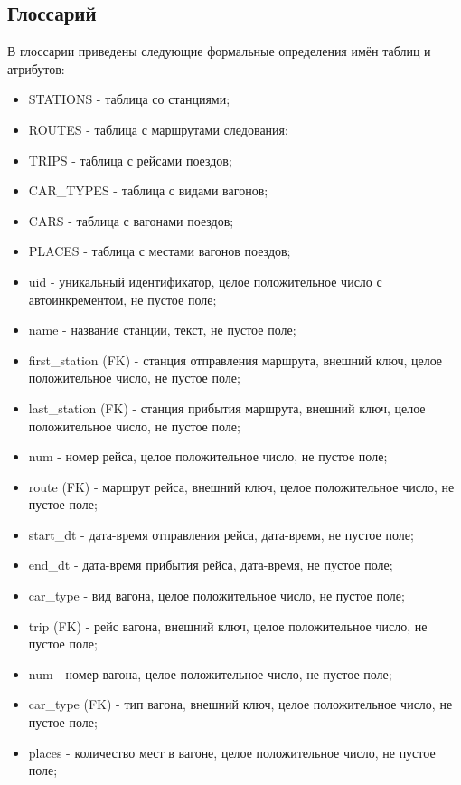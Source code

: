     \subsection{Глоссарий}
        В глоссарии приведены следующие формальные определения имён таблиц и атрибутов:
        \begin{itemize}
            \item STATIONS - таблица со станциями;
            \item ROUTES - таблица с маршрутами следования;
            \item TRIPS - таблица с рейсами поездов;
            \item CAR\_TYPES - таблица с видами вагонов;
            \item CARS - таблица с вагонами поездов;
            \item PLACES - таблица с местами вагонов поездов;
            \item uid - уникальный идентификатор, целое положительное число с автоинкрементом, не пустое поле;
            \item name - название станции, текст, не пустое поле;
            \item first\_station (FK) - станция отправления маршрута, внешний ключ, целое положительное число, не пустое поле;
            \item last\_station (FK) - станция прибытия маршрута, внешний ключ, целое положительное число, не пустое поле;
            \item num - номер рейса, целое положительное число, не пустое поле;
            \item route (FK) - маршрут рейса, внешний ключ, целое положительное число, не пустое поле;
            \item start\_dt - дата-время отправления рейса, дата-время, не пустое поле;
            \item end\_dt - дата-время прибытия рейса, дата-время, не пустое поле;
            \item car\_type - вид вагона, целое положительное число, не пустое поле;
            \item trip (FK) - рейс вагона, внешний ключ, целое положительное число, не пустое поле;
            \item num - номер вагона, целое положительное число, не пустое поле;
            \item car\_type (FK) - тип вагона, внешний ключ, целое положительное число, не пустое поле;
            \item places - количество мест в вагоне, целое положительное число, не пустое поле;

\end{itemize}
